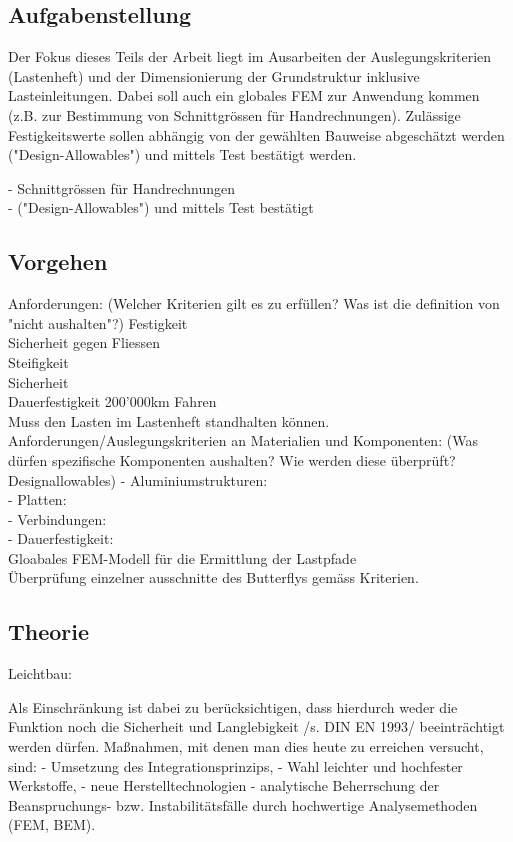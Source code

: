 \subsection{Aufgabenstellung}
Der Fokus dieses Teils der Arbeit liegt im Ausarbeiten der Auslegungskriterien (Lastenheft) und der Dimensionierung der Grundstruktur inklusive Lasteinleitungen.
Dabei soll auch ein globales FEM zur Anwendung kommen (z.B. zur Bestimmung von Schnittgrössen für Handrechnungen).
Zulässige Festigkeitswerte sollen abhängig von der gewählten Bauweise abgeschätzt werden ("Design-Allowables") und mittels Test bestätigt werden.

  - Schnittgrössen für Handrechnungen\\
  - ("Design-Allowables") und mittels Test bestätigt

\subsection{Vorgehen}
Anforderungen: (Welcher Kriterien gilt es zu erfüllen? Was ist die definition von "nicht aushalten"?)
  Festigkeit\\
  Sicherheit gegen Fliessen\\
  Steifigkeit\\
  Sicherheit\\
  Dauerfestigkeit 200'000km Fahren\\
  Muss den Lasten im Lastenheft standhalten können.\\

Anforderungen/Auslegungskriterien an Materialien und Komponenten: (Was dürfen spezifische Komponenten aushalten? Wie werden diese überprüft? Designallowables)
  - Aluminiumstrukturen:\\
  - Platten:\\
  - Verbindungen:\\
  - Dauerfestigkeit:\\

Gloabales FEM-Modell für die Ermittlung der Lastpfade\\
Überprüfung einzelner ausschnitte des Butterflys gemäss Kriterien.

\subsection{Theorie}
Leichtbau:

Als Einschränkung ist dabei zu berücksichtigen, dass hierdurch weder die Funktion noch die Sicherheit und Langlebigkeit /s. DIN EN 1993/ beeinträchtigt werden dürfen. Maßnahmen, mit denen man dies heute zu erreichen versucht, sind:
- Umsetzung des Integrationsprinzips,
- Wahl leichter und hochfester Werkstoffe,
- neue Herstelltechnologien
- analytische Beherrschung der Beanspruchungs- bzw. Instabilitätsfälle durch hochwertige Analysemethoden (FEM, BEM).

